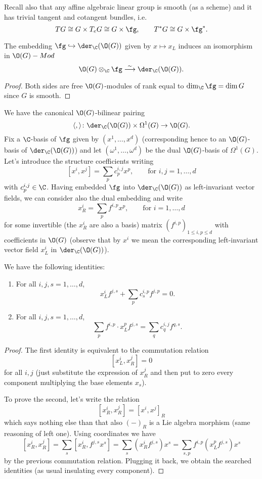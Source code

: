 \documentclass[a4paper, 10pt]{article}
\begin{document}
            Recall also that any affine algebraic linear group is smooth (as a scheme) and it has trivial tangent and cotangent bundles, i.e.\ \[TG \cong G \times T_eG \cong G \times \fg, \qquad T^*G \cong G \times \fg^*. \]
            \begin{lemma}
                The embedding $\fg \hookrightarrow \der_{\C}(\O(G))$ given by $x \mapsto x_L$ induces an isomorphism in $\O(G)-Mod$ \[\O(G) \otimes_{\C} \fg \stackrel{\sim}{\longrightarrow} \der_{\C}(\O(G)). \]
            \end{lemma}
            \begin{proof}
                Both sides are free $\O(G)$-modules of rank equal to $\dim_{\C} \fg = \dim G$ since $G$ is smooth. 
            \end{proof}
            We have the canonical $\O(G)$-bilinear pairing \[\langle,\rangle\colon \der_{\C}(\O(G)) \times \Omega^1(G) \to \O(G). \] Fix a $\C$-basis of $\fg$ given by $(x^1, \dots, x^d)$ (corresponding hence to an $\O(G)$-basis of $\der_{\C}(\O(G))$) and let $(\omega^1, \dots, \omega^d)$ be the dual $\O(G)$-basis of $\Omega^1(G)$. Let's introduce the structure coefficients writing \[[x^i, x^j] = \sum_p c_p^{i,j}x^p,\qquad \text{for $i,j=1,\dots,d$} \] with $c_p^{i,j} \in \C$.
            Having embedded $\fg$ into $\der_{\C}(\O(G))$ as left-invariant vector fields, we can consider also the dual embedding and write \[x^i_R = \sum_p f^{i,p}x^p, \qquad \text{for $i=1,\dots,d$} \] for some invertible (the $x^i_R$ are also a basis) matrix $(f^{i,p})_{1 \leq i, p \leq d}$ with coefficients in $\O(G)$ (observe that by $x^i$ we mean the corresponding left-invariant vector field $x^i_L$ in $\der_{\C}(\O(G))$).
            \begin{lemma}
                \label{lemma:B2}
                We have the following identities:
                \begin{enumerate}[label=(\roman*)]
                    \item For all $i, j, s = 1, \dots, d$, \[x^i_Lf^{j,s} + \sum_p c_s^{i,p}f^{j,p} = 0. \]
                    \item For all $i, j, s = 1, \dots, d$, \[\sum_p f^{i,p}\cdot x^p_Lf^{j,s} = \sum_q c^{i,j}_qf^{q,s}. \]
                \end{enumerate}
            \end{lemma}
            \begin{proof}
                The first identity is equivalent to the commutation relation \[[x^i_L, x^j_R] = 0 \] for all $i, j$ (just substitute the expression of $x^j_R$ and then put to zero every component multiplying the base elements $x_s$).

                To prove the second, let's write the relation \[[x^i_R, x^j_R] = [x^i, x^j]_R \] which says nothing else than that also $(-)_R$ is a Lie algebra morphism (same reasoning of left one). Using coordinates we have \[[x^i_R, x^j_R] = \sum_s [x^i_R, f^{j,s}x^s] = \sum_s (x^i_Rf^{j,s})x^s = \sum_{s,p} f^{i,p}(x^p_Lf^{j,s})x^s \] by the previous commutation relation. Plugging it back, we obtain the searched identities (as usual insulating every component).
            \end{proof}
\end{document}
